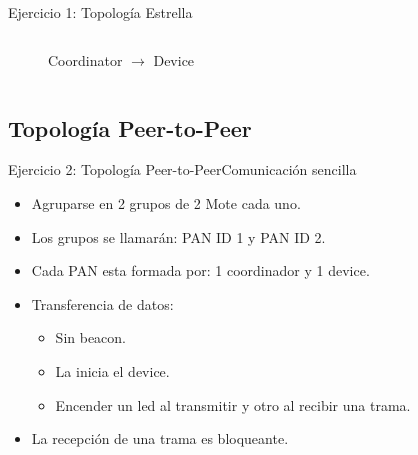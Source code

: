 \documentclass[aspectratio=169, handout]{beamer}
\begin{document}
\begin{frame}[t]{Ejercicio 1: Topología Estrella}
\begin{columns}[t]
\begin{column}{.5\textwidth}
\begin{minipage}[t][0.7\textheight][s]{\columnwidth}
\begin{figure}[H]
                \vfill
                \caption{Coordinator $\rightarrow$ Device}
            \end{figure}            
        \end{minipage}
    \end{column}
\end{columns}          
\end{frame}


\subsection[Peer-to-Peer]{Topología Peer-to-Peer}
\begin{frame}[t]{Ejercicio 2: Topología Peer-to-Peer}{Comunicación sencilla}
    \begin{itemize}
        \item Agruparse en 2 grupos de 2 Mote cada uno.
        \vspace{5px}
        \item Los grupos se llamarán: PAN ID 1 y PAN ID 2.
        \vspace{5px}
        \item Cada PAN esta formada por: 1 coordinador y 1 device.
        \vspace{5px}
        \item Transferencia de datos:
            \begin{itemize}
            \item Sin beacon.
            \vspace{5px}
            \item La inicia el device.
            \vspace{5px}   
            \item Encender un led al transmitir y otro al recibir una trama.
            \vspace{5px}
            \end{itemize}
        \item La recepción de una trama es bloqueante.
        \vspace{5px}
    \end{itemize}
\end{frame}

\end{document}
